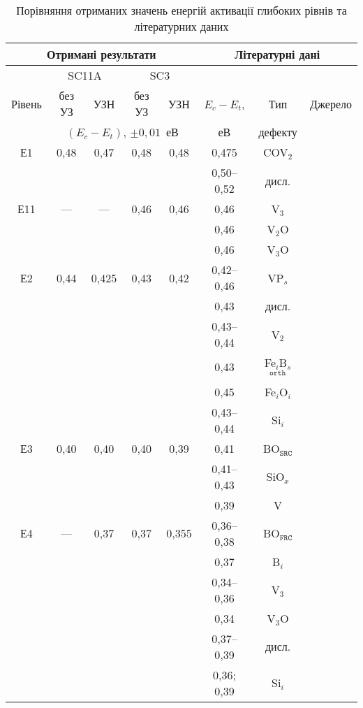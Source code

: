 \begin{table}
\caption{\label{tabBulEtUSL}Порівняння отриманих значень енергій активації глибоких рівнів та літературних даних
}
\small
\center
\begin{tabular}{|c|c|c|c|c|c|c|c|}
\hline
\multicolumn{5}{|c|}{Отримані результати}&\multicolumn{3}{c|}{Літературні дані}\\ \hline
&\multicolumn{2}{c|}{SC11A}&\multicolumn{2}{c|}{SC3}&&&\\ \cline{2-5}
Рівень&без УЗ&УЗН&без УЗ&УЗН&$E_c-E_t$,&Тип&Джерело\\ \cline{2-5}
&\multicolumn{4}{c|}{$(E_c-E_t)$, $\pm0,01$~еВ}&еВ&дефекту&\\
\hhline{|========|}
Е1&0,48&0,47&0,48&0,48&0,475&COV$_2$&\cite{Lugakov}\\\cline{6-8}
&&&&&0,50--0,52&дисл.&\cite{Edis:Ogawa,Edis:Omling,Kittler2003}\\ \hline
Е11&---&---&0,46&0,46&0,46&V$_3$&\cite{V3:PRB2012,V3:Markevich}\\ \cline{6-8}
&&&&&0,46&V$_2$O&\cite{V2:JAP2014}\\ \cline{6-8}
&&&&&0,46&V$_3$O&\cite{V3:Markevich}\\ \hline
Е2&0,44&0,425&0,43&0,42&0,42--0,46&VP$_s$&\cite{VI:Luc,Kuchinskii,Karazh,Ecentre:2005}\\ \cline{6-8}
&&&&&0,43&дисл.&\cite{SiO:Vanhell}\\ \cline{6-8}
&&&&&0,43--0,44&V$_2$&\cite{V2:JAP2014,V2:PRB2002}\\ \cline{6-8}
&&&&&0,43&Fe$_i$B$_s$$^\mathtt{orth}$&\cite{FeB:PhysRevB49,Istratov1999}\\ \cline{6-8}
&&&&&0,45&Fe$_i$O$_i$&\cite{FeO}\\ \cline{6-8}
&&&&&0,43--0,44&Si$_i$&\cite{VI:Luc,Si:Sii}\\ \hline
Е3&0,40&0,40&0,40&0,39&0,41&BO$_\mathtt{SRC}$&\cite{LIDRev,LIDRev2,Rein,LID:SchmidtJMR}\\ \cline{6-8}
&&&&&0,41--0,43&SiO$_x$&\cite{SiO:Mchedlidze,SiO:Vanhell,SiO:Chan}\\ \cline{6-8}
&&&&&0,39&V&\cite{MSER55}\\ \hline
Е4&---&0,37&0,37&0,355&0,36--0,38&BO$_\mathtt{FRC}$& \cite{LIDRev2,BOSingle:SEMSS2017}\\ \cline{6-8}
&&&&&0,37&B$_i$&\cite{Lugakov}\\ \cline{6-8}
&&&&&0,34--0,36&V$_3$&\cite{V3:PRB2012,V3:Markevich}\\ \cline{6-8}
&&&&&0,34&V$_3$O&\cite{V3:Markevich}\\ \cline{6-8}
&&&&&0,37--0,39&дисл.&\cite{PhysRevB56:10208,kveder2008,SiO:Hwang,disl10:Isakova,Kittler2003}\\ \cline{6-8}
&&&&&0,36; 0,39&Si$_i$&\cite{MSER55,Si:Sii}\\ \hline
\end{tabular}
\end{table}



